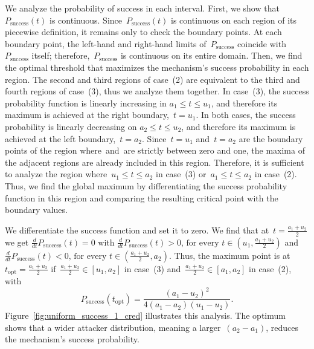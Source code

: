 \documentclass[conference,compsoc]{IEEEtran}
\begin{document}
We analyze the probability of success in each interval. First, we show that~$P_{\text{success}}(t)$ is continuous. Since~$P_{\text{success}}(t)$ is continuous on each region of its piecewise definition, it remains only to check the boundary points. At each boundary point, the left-hand and right-hand limits of~$P_{\text{success}}$ coincide with~$P_{\text{success}}$ itself; therefore,~$P_{\text{success}}$ is continuous on its entire domain. Then, we find the optimal threshold that maximizes the mechanism's success probability in each region. The second and third regions of case~(2) are equivalent to the third and fourth regions of case~(3), thus we analyze them together. In case~(3), the success probability function is linearly increasing in $a_1 \le t \le u_1$, and therefore its maximum is achieved at the right boundary,~$t = u_1$. In both cases, the success probability is linearly decreasing on $a_2 \le t \le u_2$, and therefore its maximum is achieved at the left boundary,~$t = a_2$. Since~$t = u_1$ and~$t = a_2$ are the boundary points of the region where~\FAR and~\FRR are strictly between zero and one, the maxima of the adjacent regions are already included in this region. Therefore, it is sufficient to analyze the region where~$u_1 \le t \le a_2$ in case~(3) or~$a_1 \le t \le a_2$ in case~(2).
Thus, we find the global maximum by differentiating the success probability function in this region and comparing the resulting critical point with the boundary values.

We differentiate the success function and set it to zero.
We find that at~$t = \frac{a_1+u_2}{2}$ we get $\frac{d}{dt} P_{\text{success}}(t) = 0$ with
$\frac{d}{dt} P_{\text{success}}(t) > 0 \text{, for every } t \in (u_1, \frac{a_1+u_2}{2})$
and
$\frac{d}{dt} P_{\text{success}}(t) < 0 \text{, for every } t \in (\frac{a_1+u_2}{2}, a_2).$
Thus, the maximum point is at~$t_{\text{opt}} = \frac{a_1 + u_2}{2}$ if~$\frac{a_1+u_2}{2} \in [u_1, a_2]$ in case~(3) and~$\frac{a_1+u_2}{2} \in [a_1, a_2]$ in case~(2), with
\begin{equation*}
P_{\text{success}}(t_{\text{opt}}) = \frac{(a_1 - u_2)^2}{4 (a_1 - a_2) (u_1 - u_2)}.
\end{equation*}
Figure~\ref{fig:uniform_success_1_cred} illustrates this analysis.
The optimum shows that a wider attacker distribution, meaning a larger~$(a_2 - a_1)$, reduces the mechanism's success probability.
\end{document}
